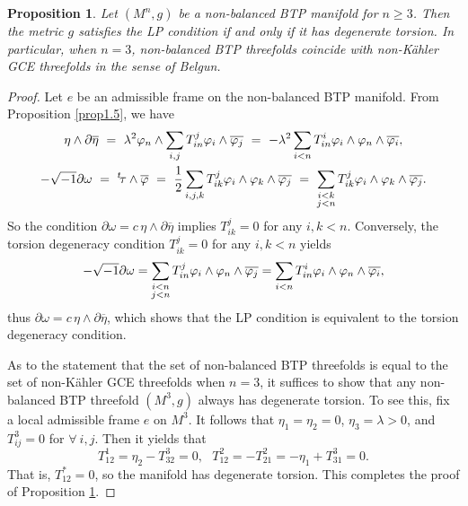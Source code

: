 \documentclass{amsart}
\numberwithin{equation}{section}
\newtheorem{proposition}[theorem]{Proposition}
\theoremstyle{definition}
\renewcommand{\1}{\mathds{1}}
\renewcommand{\>}{\rightarrow}
\begin{document}
\begin{proposition}\label{BTP_LP}
Let $(M^n,g)$ be a non-balanced BTP manifold for $n\geq 3$.
Then the metric $g$ satisfies the LP condition if and only if it has degenerate torsion.
In particular, when $n=3$, non-balanced BTP threefolds coincide with non-K\"ahler GCE threefolds
in the sense of Belgun.
\end{proposition}


\begin{proof}
Let $e$ be an admissible frame on the non-balanced BTP manifold.
From Proposition \ref{prop1.5}, we have
\begin{gather*}
\eta \wedge \partial \overline{\eta}\ =\  \lambda^2 \varphi_n \wedge \sum_{i,j} T_{i n}^j \varphi_i \wedge \overline{\varphi_j}
\ = \ -\lambda^2 \sum_{i < n} T_{i n}^i \varphi_i \wedge\varphi_n \wedge \overline{\varphi_i},\\
-\sqrt{-1}\partial \omega\ =\ ^t\!\tau \wedge \overline{\varphi}
\ =\ \frac{1}{2}\sum_{i,j,k} T_{ik}^j \varphi_i \wedge \varphi_k \wedge \overline{\varphi_j}
\ = \ \sum_{\begin{subarray}{c}i<k\\j<n\end{subarray}}T^j_{ik}\varphi_i \wedge \varphi_k \wedge \overline{\varphi_j}.
\end{gather*}
So the condition $\partial \omega = c \,\eta \wedge \partial \overline{\eta}$ implies $T^{j }_{ik}=0$ for any $i,k <n$.
Conversely, the torsion degeneracy condition $T^{j }_{ik}=0$ for any $i,k <n$ yields
\[-\sqrt{-1}\partial \omega =\sum_{\begin{subarray}{c}i<n\\j<n\end{subarray}} T^j_{in}\varphi_i \wedge \varphi_n \wedge \overline{\varphi_j}
=\sum_{i<n} T^i_{in}\varphi_i \wedge \varphi_n \wedge \overline{\varphi_i}, \]
thus $\partial \omega = c \,\eta \wedge \partial \overline{\eta}$,
which shows that the LP condition is equivalent to the torsion degeneracy condition.

As to the statement that the set of non-balanced BTP threefolds is equal to
the set of non-K\"ahler GCE threefolds when $n=3$, it suffices to show
that any non-balanced BTP threefold $(M^3,g)$ always has degenerate torsion.
To see this, fix a local admissible frame $e$ on $M^3$. It follows that
$\eta_1=\eta_2=0$, $\eta_3=\lambda >0$, and $T^3_{ij}=0$ for $\forall\ i,j$.
Then it yields that
$$ T^1_{12} = \eta_2- T^3_{32} = 0, \ \ \ T^2_{12} = - T^2_{21} = -\eta_1 + T^3_{31} = 0.$$
That is, $T^{\ast}_{12}=0$, so the manifold has degenerate torsion. This completes the proof of Proposition \ref{BTP_LP}.
\end{proof}
\end{document}

